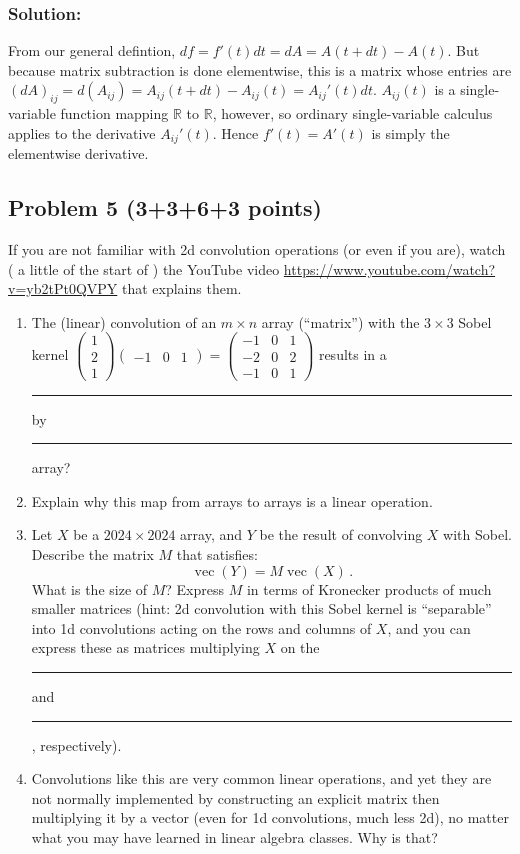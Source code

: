 \documentclass[10pt,oneside]{article}
\newcommand{\vecm}{\operatorname{vec}}
\begin{document}
\subsubsection*{Solution:}

From our general defintion, $df = f'(t)dt = dA = A(t+dt) - A(t)$.  But because matrix subtraction is done elementwise, this is a matrix whose entries are $(dA)_{ij} = d(A_{ij}) = A_{ij}(t+dt) - A_{ij}(t) = A_{ij}'(t) dt$. $A_{ij}(t)$ is a single-variable function mapping $\mathbb{R}$ to $\mathbb{R}$, however, so ordinary single-variable calculus applies to the derivative $A_{ij}'(t)$.
Hence $f'(t) = A'(t)$ is simply the elementwise derivative.
 
\subsection*{Problem 5 (3+3+6+3 points)}

If you are not familiar  with 2d convolution operations (or even if you are), watch ( a little of the start of  ) the 
YouTube video   \url{https://www.youtube.com/watch?v=yb2tPt0QVPY} that explains them.

\begin{enumerate}
\item
The (linear) convolution of an $m \times n$ array (``matrix'') with the $3 \times 3$ Sobel kernel $ \begin{pmatrix} 1 \\ 2 \\ 1 \end{pmatrix} \begin{pmatrix} -1 & 0 & 1 \end{pmatrix} = \begin{pmatrix} -1 & 0 & 1 \\ -2 & 0 & 2 \\ -1 & 0 & 1 \end{pmatrix} $ results in a \rule{1cm}{0.15mm}  by  \rule{1cm}{0.15mm} array?

\item Explain why this map from arrays to arrays is a linear operation.

\item Let $X$ be a $2024 \times 2024$ array, and  $Y$ be the result of convolving $X$ with Sobel.  Describe the matrix $M$ that satisfies:
$$ \vecm(Y) = M \vecm(X) \, .$$ What is the size of $M$?  Express $M$ in terms of Kronecker products of much smaller matrices (hint: 2d convolution with this Sobel kernel is ``separable'' into 1d convolutions acting on the rows and columns of $X$, and you can express these as matrices multiplying $X$ on the \rule{1cm}{0.15mm} and \rule{1cm}{0.15mm}, respectively).

\item Convolutions like this are  very common linear operations, 
and yet they are not normally implemented by constructing an explicit matrix then multiplying it by a vector (even for 1d convolutions, much less 2d),
no matter what you may have learned in linear algebra classes.
Why is that?

\end{enumerate}
\end{document}

